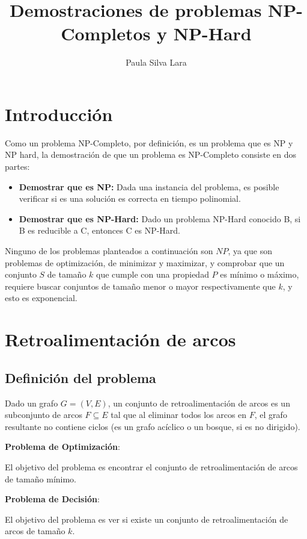 \documentclass{article}
\title{Demostraciones de problemas NP-Completos y NP-Hard}
\author{Paula Silva Lara}
\begin{document}
\maketitle

\tableofcontents

\newpage
\section{Introducción}
Como un problema NP-Completo, por definición, es un problema que es NP y NP hard, la demostración de que un problema es NP-Completo consiste en dos partes:

\begin{itemize}
\item \textbf{Demostrar que es NP:}
Dada una instancia del problema, es posible verificar si es una solución es correcta en tiempo polinomial.
\item \textbf{Demostrar que es NP-Hard:}
Dado un problema NP-Hard conocido B, si B es reducible a C, entonces C es NP-Hard.
\end{itemize}

Ninguno de los problemas planteados a continuación son \(NP\), ya que son problemas de optimización, de minimizar y maximizar, y comprobar que un conjunto \(S\) de tamaño \(k\) que cumple con una propiedad \(P\) es mínimo o máximo, requiere buscar conjuntos de tamaño menor o mayor respectivamente que  \(k\), y esto es exponencial.

\section{Retroalimentación de arcos}

    \subsection{Definición del problema}
    Dado un grafo $G=(V,E)$, un conjunto de retroalimentación de arcos es un subconjunto de arcos $F \subseteq E$ tal que al eliminar todos los arcos en $F$, el grafo resultante no contiene ciclos (es un grafo acíclico o un bosque, si es no dirigido).

    \textbf{Problema de Optimización}:
    
    El objetivo del problema es encontrar el conjunto de retroalimentación de arcos de tamaño mínimo.

    \textbf{Problema de Decisión}:
    
    El objetivo del problema es ver si existe un conjunto de retroalimentación de arcos de tamaño $k$.
    
\end{document}

